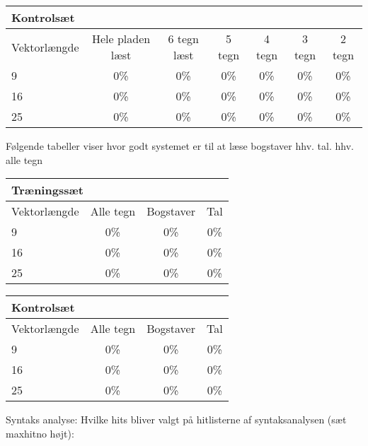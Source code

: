 \begin{tabular}{|l|c|c|c|c|c|c|}\hline
\multicolumn{7}{|l|}{Kontrolsæt} \\\hline
Vektorlængde & Hele pladen læst & 6 tegn læst & 5 tegn & 4 tegn & 3 tegn & 2 tegn \\\hline
9 & 0\% & 0\% & 0\% & 0\% & 0\% & 0\% \\\hline
16 & 0\% & 0\% & 0\% & 0\% & 0\% & 0\% \\\hline
25 & 0\% & 0\% & 0\% & 0\% & 0\% & 0\% \\\hline \end{tabular}


Følgende tabeller viser hvor godt systemet er til at læse bogstaver hhv. tal. hhv. alle tegn

\begin{tabular}{|l|c|c|c|}\hline
\multicolumn{4}{|l|}{Træningssæt} \\\hline
Vektorlængde & Alle tegn & Bogstaver & Tal \\\hline
9 & 0\% & 0\% & 0\% \\\hline
16 & 0\% & 0\% & 0\%\\\hline
25 & 0\% & 0\% & 0\%\\\hline \end{tabular}

\begin{tabular}{|l|c|c|c|}\hline
\multicolumn{4}{|l|}{Kontrolsæt} \\\hline
Vektorlængde & Alle tegn & Bogstaver & Tal \\\hline
9 & 0\% & 0\% & 0\% \\\hline
16 & 0\% & 0\% & 0\% \\\hline
25 & 0\% & 0\% & 0\% \\\hline \end{tabular}


Syntaks analyse: Hvilke hits bliver valgt på hitlisterne af syntaksanalysen (sæt maxhitno højt):

